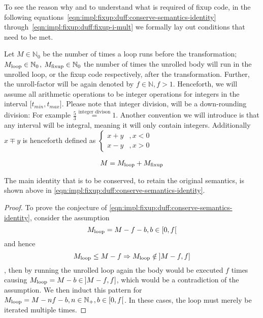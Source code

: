 To see the reason why and to understand what is required of fixup code, in the following equations~\ref{eqn:impl:fixup:duff:conserve-semantics-identity} through~\cref{eqn:impl:fixup:duff:fixup-i-mult} we formally lay out conditions that need to be met.

Let $M \in \mathbb{N}_0$ be the number of times a loop runs before the transformation; $M_{\text{loop}} \in \mathbb{N}_0$, $M_{\text{fixup}} \in \mathbb{N}_0$ the number of times the unrolled body will run in the unrolled loop, or the fixup code respectively, after the transformation.
Further, the unroll-factor will be again denoted by $f \in \mathbb{N}, f > 1$.
Henceforth, we will assume all arithmetic operations to be integer operations for integers in the interval $\lbrack t_{min}, t_{max} \rbrack$.
Please note that integer division, will be a down-rounding division: For example $\frac{5}{3} \overset{\text{integer divison}}{=} 1$.
Another convention we will introduce is that any interval will be integral, meaning it will only contain integers.
Additionally $x \mp y$ is henceforth defined as
$\begin{cases}
     x + y &, x < 0\\
     x - y &, x > 0
\end{cases}$

\begin{equation}\label{eqn:impl:fixup:duff:conserve-semantics-identity}
\begin{aligned}
    M = M_{\text{loop}} + M_{\text{fixup}}
\end{aligned}
\end{equation}

The main identity that is to be conserved, to retain the original semantics, is shown above in \cref{eqn:impl:fixup:duff:conserve-semantics-identity}.

\begin{proof}\label{proof:impl:fixup:duff:loop-iterations}
To prove the conjecture of \cref{eqn:impl:fixup:duff:conserve-semantics-identity}, consider the assumption
\[M_{\text{loop}} = M - f - b,  b \in \lbrack 0, f \lbrack \]
and hence
\[M_{\text{loop}} \leq M - f \Rightarrow M_{\text{loop}} \notin \medspace \rbrack M-f,f \rbrack  \]
, then by running the unrolled loop again the body would be executed $f$ times causing $M_{\text{loop}} = M - b \in \medspace \rbrack M-f,f \rbrack$, which would be a contradiction of the assumption.
We then induct this pattern for $M_{\text{loop}} = M - nf - b, n \in \mathbb{N}_{+}, b \in \lbrack 0, f \lbrack $.
In these cases, the loop must merely be iterated multiple times.
\end{proof}

